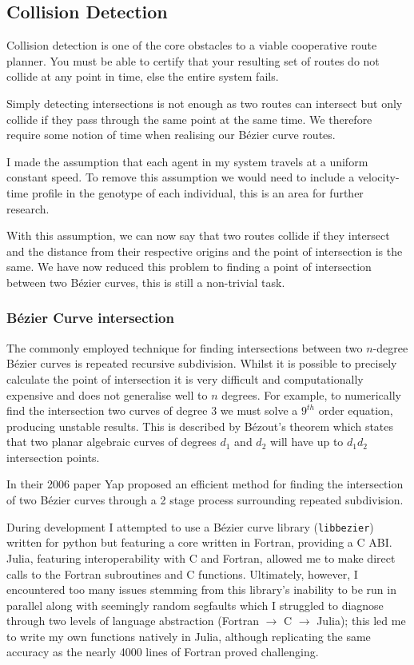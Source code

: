 \subsection{Collision Detection}
\label{subsec:col-detection}

Collision detection is one of the core obstacles to a viable cooperative route planner. You must be able to certify that your resulting set of routes do not collide at any point in time, else the entire system fails.

Simply detecting intersections is not enough as two routes can intersect but only collide if they pass through the same point at the same time. We therefore require some notion of time when realising our Bézier curve routes.

I made the assumption that each agent in my system travels at a uniform constant speed. To remove this assumption we would need to include a velocity-time profile in the genotype of each individual, this is an area for further research.

With this assumption, we can now say that two routes collide if they intersect and the distance from their respective origins and the point of intersection is the same. We have now reduced this problem to finding a point of intersection between two Bézier curves, this is still a non-trivial task.

\subsubsection{Bézier Curve intersection}

The commonly employed technique for finding intersections between two $n$-degree Bézier curves is repeated recursive subdivision. Whilst it is possible to precisely calculate the point of intersection it is very difficult and computationally expensive and does not generalise well to $n$ degrees. For example, to numerically find the intersection two curves of degree 3 we must solve a $9^{th}$ order equation, producing unstable results. This is described by Bézout's theorem which states that two planar algebraic curves of degrees $d_{1}$ and $d_{2}$ will have up to $d_{1}d_{2}$ intersection points.

In their 2006 paper Yap\cite{yapCompleteSubdivisionAlgorithms2006} proposed an efficient method for finding the intersection of two Bézier curves through a 2 stage process surrounding repeated subdivision.

During development I attempted to use a Bézier curve library (\texttt{libbezier})\cite{Hermes2017} written for python but featuring a core written in Fortran, providing a C ABI. Julia, featuring interoperability with C and Fortran, allowed me to make direct calls to the Fortran subroutines and C functions. Ultimately, however, I encountered too many issues stemming from this library's inability to be run in parallel along with seemingly random segfaults which I struggled to diagnose through two levels of language abstraction (Fortran $\rightarrow$ C $\rightarrow$ Julia); this led me to write my own functions natively in Julia, although replicating the same accuracy as the nearly 4000 lines of Fortran proved challenging.

